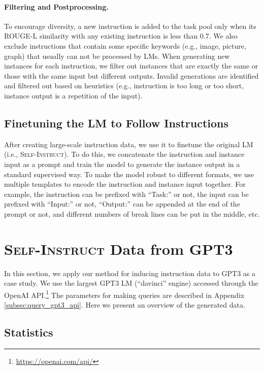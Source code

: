 \paragraph{Filtering and Postprocessing.}
\label{subsec:filtering}
To encourage diversity, a new instruction is added to the task pool only when its ROUGE-L similarity with any existing instruction is less than 0.7. We also exclude instructions that contain some specific keywords (e.g., image, picture, graph) that usually can not be processed by LMs. When generating new instances for each instruction, we filter out instances that are exactly the same or those with the same input but different outputs. Invalid generations are identified and filtered out based on heuristics (e.g., instruction is too long or too short, instance output is a repetition of the input). 

\subsection{Finetuning the LM to Follow Instructions}
\label{subsec:instruction-tuning}
After creating large-scale instruction data, we use it to finetune the original LM (i.e., \textsc{Self-Instruct}). To do this, we concatenate the instruction and instance input as a prompt and train the model to generate the instance output in a standard supervised way. To make the model robust to different formats, we use multiple templates to encode the instruction and instance input together. For example, the instruction can be prefixed with ``Task:'' or not, the input can be prefixed with ``Input:'' or not, ``Output:'' can be appended at the end of the prompt or not, and different numbers of break lines can be put in the middle, etc.

\section{\textsc{Self-Instruct} Data from \textsc{GPT3}}
\label{sec:generatd-data}

 In this section, we apply our method for inducing instruction data to \textsc{GPT3} as a case study. We use the largest GPT3 LM (``davinci'' engine) accessed through the OpenAI API.\footnote{\url{https://openai.com/api/}} The parameters for making queries are described in Appendix \ref{subsec:query_gpt3_api}. Here we present an overview of the generated data.

\subsection{Statistics}
\label{subsec:statistics}

